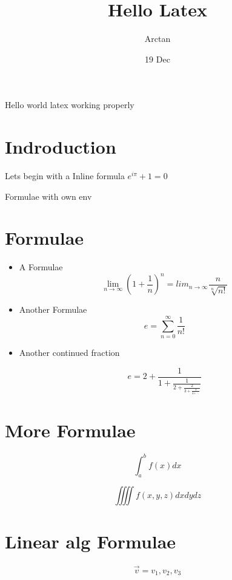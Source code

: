 \documentclass{article}
\title{Hello Latex}
\author{Arctan}
\date{19 Dec}
\begin{document}
    \maketitle
    Hello world  latex working properly
    \section{Indroduction}

    Lets begin with a Inline formula $e^{i\pi} + 1 =0$

Formulae with own env
    \section*{Formulae}
    \begin{itemize}  %
   \item A Formulae
     $$ \lim_{n\to\infty} \left(1+\frac{1}{n}\right)^n = lim_{n\to\infty}\frac{n}{\sqrt[n]{n!}} $$

   \item Another Formulae
     $$e = \sum_{n=0}^{\infty}\frac{1}{n!}$$
    
  \item  Another continued fraction

     $$e = 2+\frac{1}{1+\frac{1}{2+\frac{2}{3+\frac{3}{4+\ddots}}}}$$

\end{itemize}
    \section{More Formulae}

     $$ \int_a^bf(x)dx $$

    $$\iiiint f(x,y,z)dxdydz$$

    \section{Linear alg Formulae}
    $$\vec{v}={v_1, v_2,v_3}$$
\end{document}

